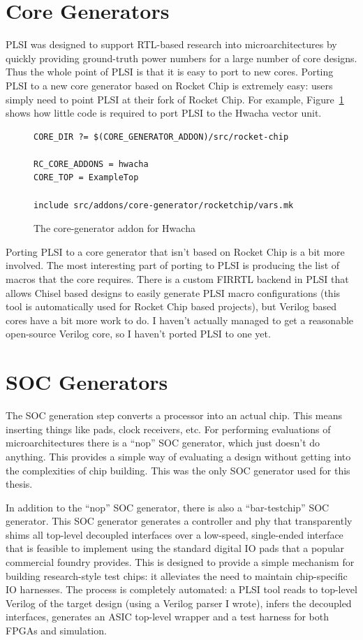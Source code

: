 \documentclass{article}
\begin{document}
\section{Core Generators}

PLSI was designed to support RTL-based research into microarchitectures by
quickly providing ground-truth power numbers for a large number of core
designs.  Thus the whole point of PLSI is that it is easy to port to new cores.
Porting PLSI to a new core generator based on Rocket Chip is extremely easy:
users simply need to point PLSI at their fork of Rocket Chip.  For example,
Figure~\ref{impl:hwacha-coregen} shows how little code is required to port PLSI
to the Hwacha vector unit.

\begin{figure}
\begin{verbatim}
CORE_DIR ?= $(CORE_GENERATOR_ADDON)/src/rocket-chip

RC_CORE_ADDONS = hwacha
CORE_TOP = ExampleTop

include src/addons/core-generator/rocketchip/vars.mk
\end{verbatim}
\caption{The core-generator addon for Hwacha}
\label{impl:hwacha-coregen}
\end{figure}

Porting PLSI to a core generator that isn't based on Rocket Chip is a bit more
involved.  The most interesting part of porting to PLSI is producing the list of
macros that the core requires.  There is a custom FIRRTL backend in PLSI that
allows Chisel based designs to easily generate PLSI macro configurations (this
tool is automatically used for Rocket Chip based projects), but Verilog based
cores have a bit more work to do.  I haven't actually managed to get a
reasonable open-source Verilog core, so I haven't ported PLSI to one yet.

\section{SOC Generators}

The SOC generation step converts a processor into an actual chip.  This means
inserting things like pads, clock receivers, etc.  For performing evaluations
of microarchitectures there is a ``nop'' SOC generator, which just doesn't do
anything.  This provides a simple way of evaluating a design without getting
into the complexities of chip building.  This was the only SOC generator used
for this thesis.

In addition to the ``nop'' SOC generator, there is also a ``bar-testchip'' SOC
generator.  This SOC generator generates a controller and phy that
transparently shims all top-level decoupled interfaces over a low-speed,
single-ended interface that is feasible to implement using the standard digital
IO pads that a popular commercial foundry provides.  This is designed to
provide a simple mechanism for building research-style test chips: it
alleviates the need to maintain chip-specific IO harnesses.  The process is
completely automated: a PLSI tool reads to top-level Verilog of the target
design (using a Verilog parser I wrote), infers the decoupled interfaces,
generates an ASIC top-level wrapper and a test harness for both FPGAs and
simulation.
\end{document}
